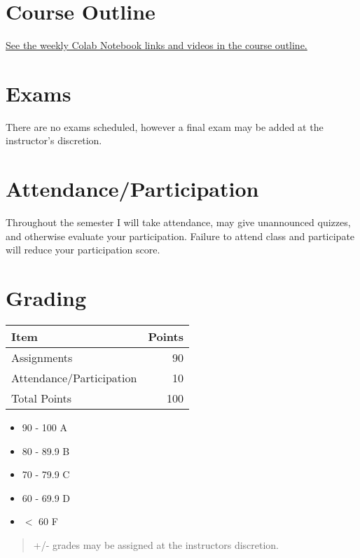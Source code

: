 \documentclass[11pt]{article}
\begin{document}
\section{Course Outline}
\label{sec:org718fd08}

\href{https://financial-education.github.io/python\_for\_finance\_outline/}{See the weekly Colab Notebook links and videos in the course outline.}
\section{Exams}
\label{sec:org9ee26d9}

There are no exams scheduled, however a final exam may be added at the instructor's discretion. 
\section{Attendance/Participation}
\label{sec:org51ead70}

Throughout the semester I will take attendance, may give unannounced quizzes, and otherwise evaluate your participation.  Failure to attend class and participate will reduce your participation score.
\section{Grading}
\label{sec:org5964255}

\begin{center}


\begin{center}
\begin{tabular}{lr}
Item & Points\\
\hline
Assignments & 90\\
Attendance/Participation & 10\\
\hline
Total Points & 100\\
\hline
\end{tabular}
\end{center}
\end{center}

\begin{itemize}
\item 90 - 100 A
\item 80 - 89.9 B
\item 70 - 79.9 C
\item 60 - 69.9 D
\item \(<\) 60 F
\end{itemize}

\begin{quote}
+/- grades may be assigned at the instructors discretion.
\end{quote}
\end{document}
